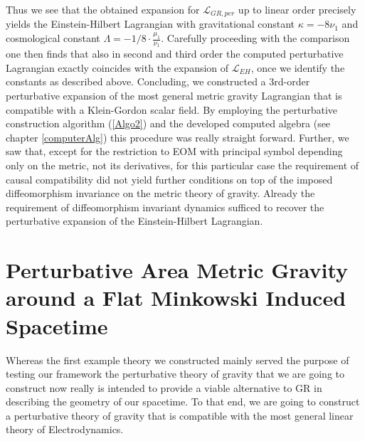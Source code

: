 Thus we see that the obtained expansion for $\mathcal{L}_{GR,per}$ up to linear order precisely yields the Einstein-Hilbert Lagrangian with gravitational constant $\kappa = -8 \nu_1$ and cosmological constant $\Lambda = -1/8 \cdot \frac{\mu_1}{\nu_1}$. Carefully proceeding with the comparison one then finds that also in second and third order the computed perturbative Lagrangian exactly coincides with the expansion of $\mathcal{L}_{EH}$, once we identify the constants as described above. 
Concluding, we constructed a $3$rd-order perturbative expansion of the most general metric gravity Lagrangian that is compatible with a Klein-Gordon scalar field. By employing the perturbative construction algorithm (\ref{Algo2}) and the developed computed algebra (see chapter \ref{computerAlg}) this procedure was really straight forward. 
Further, we saw that, except for the restriction to EOM with principal symbol depending only on the metric, not its derivatives, for this particular case the requirement of causal compatibility did not yield further conditions on top of the imposed diffeomorphism invariance on the metric theory of gravity.
Already the requirement of diffeomorphism invariant dynamics sufficed to recover the perturbative expansion of the Einstein-Hilbert Lagrangian.

\section{Perturbative Area Metric Gravity around a Flat Minkowski Induced Spacetime}
Whereas the first example theory we constructed mainly served the purpose of testing our framework the perturbative theory of gravity that we are going to construct now really is intended to provide a viable alternative to GR in describing the geometry of our spacetime.  
To that end, we are going to construct a perturbative theory of gravity that is compatible with the most general linear theory of Electrodynamics. 


